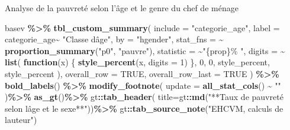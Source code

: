 \documentclass[
]{article}
\newenvironment{Shaded}{\begin{snugshade}}{\end{snugshade}}
\newcommand{\AttributeTok}[1]{\textcolor[rgb]{0.13,0.29,0.53}{#1}}
\newcommand{\ConstantTok}[1]{\textcolor[rgb]{0.56,0.35,0.01}{#1}}
\newcommand{\ControlFlowTok}[1]{\textcolor[rgb]{0.13,0.29,0.53}{\textbf{#1}}}
\newcommand{\DecValTok}[1]{\textcolor[rgb]{0.00,0.00,0.81}{#1}}
\newcommand{\FunctionTok}[1]{\textcolor[rgb]{0.13,0.29,0.53}{\textbf{#1}}}
\newcommand{\NormalTok}[1]{#1}
\newcommand{\SpecialCharTok}[1]{\textcolor[rgb]{0.81,0.36,0.00}{\textbf{#1}}}
\newcommand{\StringTok}[1]{\textcolor[rgb]{0.31,0.60,0.02}{#1}}
\begin{document}
Analyse de la pauvreté selon l'âge et le genre du chef de ménage

\begin{Shaded}
\begin{Highlighting}[]
\NormalTok{basev }\SpecialCharTok{\%\textgreater{}\%}
  \FunctionTok{tbl\_custom\_summary}\NormalTok{(}
    \AttributeTok{include =} \StringTok{"categorie\_age"}\NormalTok{,}
    \AttributeTok{label =}\NormalTok{ categorie\_age}\SpecialCharTok{\textasciitilde{}} \StringTok{"Classe d\textquotesingle{}âge"}\NormalTok{,}
    \AttributeTok{by =} \StringTok{"hgender"}\NormalTok{,}
    \AttributeTok{stat\_fns =} \SpecialCharTok{\textasciitilde{}} \FunctionTok{proportion\_summary}\NormalTok{(}\StringTok{"p0"}\NormalTok{, }\StringTok{"pauvre"}\NormalTok{),}
    \AttributeTok{statistic =} \SpecialCharTok{\textasciitilde{}}\StringTok{"\{prop\}\% "}\NormalTok{,}
    \AttributeTok{digits =} \SpecialCharTok{\textasciitilde{}} \FunctionTok{list}\NormalTok{(}
      \ControlFlowTok{function}\NormalTok{(x) \{}
        \FunctionTok{style\_percent}\NormalTok{(x, }\AttributeTok{digits =} \DecValTok{1}\NormalTok{)}
\NormalTok{      \},}
      \DecValTok{0}\NormalTok{, }\DecValTok{0}\NormalTok{, style\_percent, style\_percent}
\NormalTok{    ),}
    \AttributeTok{overall\_row =} \ConstantTok{TRUE}\NormalTok{,   }
    \AttributeTok{overall\_row\_last =} \ConstantTok{TRUE} 
\NormalTok{  ) }\SpecialCharTok{\%\textgreater{}\%}
  \FunctionTok{bold\_labels}\NormalTok{() }\SpecialCharTok{\%\textgreater{}\%} 
  \FunctionTok{modify\_footnote}\NormalTok{(}
    \AttributeTok{update =} \FunctionTok{all\_stat\_cols}\NormalTok{() }\SpecialCharTok{\textasciitilde{}} \StringTok{""}
\NormalTok{  )}\SpecialCharTok{\%\textgreater{}\%}
  \FunctionTok{as\_gt}\NormalTok{()}\SpecialCharTok{\%\textgreater{}\%}
\NormalTok{  gt}\SpecialCharTok{::}\FunctionTok{tab\_header}\NormalTok{(}
    \AttributeTok{title=}\NormalTok{gt}\SpecialCharTok{::}\FunctionTok{md}\NormalTok{(}\StringTok{"**Taux de pauvreté selon l\textquotesingle{}âge et le sexe**"}\NormalTok{))}\SpecialCharTok{\%\textgreater{}\%}
\NormalTok{  gt}\SpecialCharTok{::}\FunctionTok{tab\_source\_note}\NormalTok{(}\StringTok{"EHCVM, calculs de l\textquotesingle{}auteur"}\NormalTok{)}
\end{Highlighting}
\end{Shaded}
\end{document}
